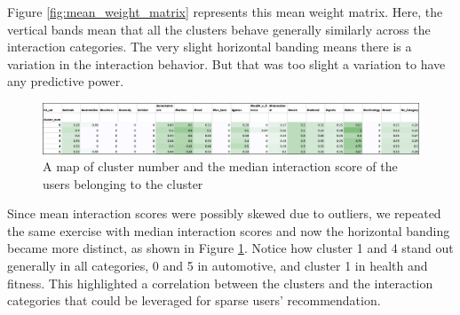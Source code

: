 Figure \ref{fig:mean_weight_matrix} represents this mean weight matrix. Here, the vertical bands mean that all the clusters behave generally similarly across the interaction categories. The very slight horizontal banding means there is a variation in the interaction behavior. But that was too slight a variation to have any predictive power.  

\begin{figure}
  \centering
  \includegraphics[width=\linewidth]{figures/median_weight_matrix.jpg}
  \caption[Median Weight Matrix]{A map of cluster number and the median interaction score of the users belonging to the cluster}
  \label{fig:median_weight_matrix}
\end{figure}

Since mean interaction scores were possibly skewed due to outliers, we repeated the same exercise with median interaction scores and now the horizontal banding became more distinct, as shown in Figure \ref{fig:median_weight_matrix}. Notice how cluster 1 and 4 stand out generally in all categories, 0 and 5 in automotive, and cluster 1 in health and fitness. This highlighted a correlation between the clusters and the interaction categories that could be leveraged for sparse users’ recommendation.


